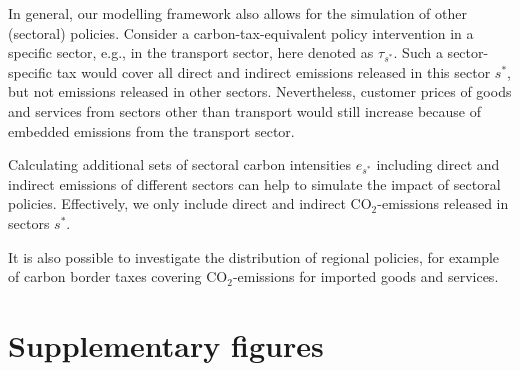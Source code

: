 \documentclass[12pt, a4paper]{article}
\begin{document}
In general, our modelling framework also allows for the simulation of other (sectoral) policies. Consider a carbon-tax-equivalent policy intervention in a specific sector, e.g., in the transport sector, here denoted as $\tau_{s^{*}}$. Such a sector-specific tax would cover all direct and indirect emissions released in this sector $s^{*}$, but not emissions released in other sectors. Nevertheless, customer prices of goods and services from sectors other than transport would still increase because of embedded emissions from the transport sector.

Calculating additional sets of sectoral carbon intensities $e_{s^{*}}$ including direct and indirect emissions of different sectors can help to simulate the impact of sectoral policies. Effectively, we only include direct and indirect CO$_{2}$-emissions released in sectors $s^{*}$.

It is also possible to investigate the distribution of regional policies, for example of carbon border taxes covering CO$_{2}$-emissions for imported goods and services. 

\clearpage

\renewcommand\thefigure{\thesection.\arabic{figure}}
\renewcommand\thetable{\thesection.\arabic{table}}
\setcounter{figure}{0}
\setcounter{table}{0}

\section{Supplementary figures} \label{sec:figures}


\clearpage


\clearpage


\clearpage


\clearpage
\end{document}
